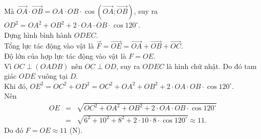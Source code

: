 \begin{bt}
{		Mà $\overrightarrow{OA} \cdot \overrightarrow{OB}=OA \cdot OB \cdot \cos \left(\overrightarrow{OA};\overrightarrow{OB}\right)$, suy ra $OD^2= OA^2 + OB^2 + 2 \cdot OA \cdot OB  \cdot \cos 120^\circ$.\\
		Dựng hình  bình hành $ODEC$.\\
		Tổng  lực tác động vào vật là $\overrightarrow{F}=\overrightarrow{OE}=\overrightarrow{OA}+\overrightarrow{OB}+\overrightarrow{OC}$.\\
		Độ  lớn của hợp lực tác động vào vật là $F=OE$.\\
		Vì $OC \perp(OADB)$ nên $OC \perp  OD$, suy ra $ODEC$ là hình chữ nhật.
		Do đó tam giác $ODE$ vuông  tại $D$.\\
		Khi đó, $OE^2=OC^2+OD^2=OC^2+OA^2+OB^2+2  \cdot OA \cdot OB \cdot \cos 120^\circ$.\\
		 Nên
		\begin{eqnarray*}
			OE &=& \sqrt{OC^2+OA^2+OB^2+2 \cdot OA \cdot  OB \cdot \cos 120^\circ}\\
			&=& \sqrt{6^2+10^2+8^2+2 \cdot 10  \cdot 8 \cdot \cos 120^\circ} \approx 11.
		\end{eqnarray*}
		Do đó $F=O E \approx 11$ (N). 
	} 
\end{bt}

